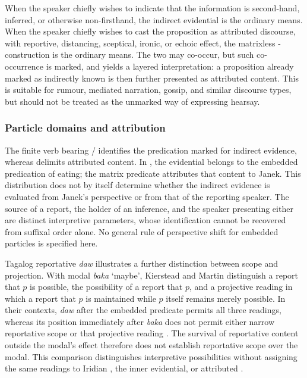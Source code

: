 When the speaker chiefly wishes to indicate that the information is second-hand,
inferred, or otherwise non-firsthand, the indirect evidential is the ordinary
means. When the speaker chiefly wishes to cast the proposition as attributed
discourse, with reportive, distancing, sceptical, ironic, or echoic effect, the
matrixless -construction is the ordinary means. The two may co-occur,
but such co-occurrence is marked, and yields a layered interpretation: a
proposition already marked as indirectly known is then further presented as
attributed content. This is suitable for rumour, mediated narration, gossip, and
similar discourse types, but should not be treated as the unmarked way of
expressing hearsay.

\subsubsection{Particle domains and attribution}
\label{sec:particle-domains-attribution}

The finite verb bearing / identifies the predication
marked for indirect evidence, whereas  delimits attributed
content. In , the
evidential belongs to the embedded predication of eating; the matrix
predicate attributes that content to Janek. This distribution does not by
itself determine whether the indirect evidence is evaluated from Janek's
perspective or from that of the reporting speaker. The source of a report,
the holder of an inference, and the speaker presenting either are distinct
interpretive parameters, whose identification cannot be recovered from
suffixal order alone. No general rule of perspective shift for embedded
particles is specified here.

Tagalog reportative \textit{daw} illustrates a further distinction between
scope and projection. With modal \textit{baka} `maybe', Kierstead and
Martin distinguish a report that $p$ is possible, the possibility of a
report that $p$, and a projective reading in which a report that $p$
is maintained while $p$ itself remains merely possible. In their
contexts, \textit{daw} after the embedded predicate permits all three
readings, whereas its position immediately after \textit{baka} does not
permit either narrow reportative scope or that projective reading
\cite[§2, especially Table~1, pp.~330--332]{kiersteadmartin2012}.
The survival of reportative content outside the modal's effect therefore
does not establish reportative scope over the modal. This comparison
distinguishes interpretive possibilities without assigning the same
readings to Iridian , the inner evidential, or attributed
.

